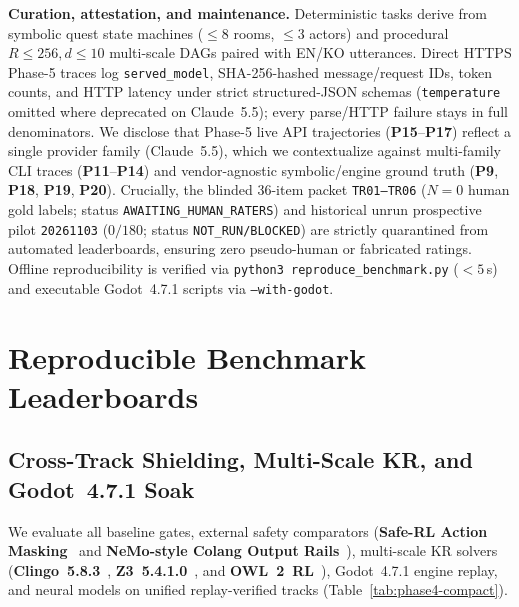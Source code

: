\textbf{Curation, attestation, and maintenance.} Deterministic tasks derive from symbolic quest state machines (${\le}8$ rooms, ${\le}3$ actors) and procedural $R{\le}256, d{\le}10$ multi-scale DAGs paired with EN/KO utterances. Direct HTTPS Phase-5 traces log \texttt{served\_model}, SHA-256-hashed message/request IDs, token counts, and HTTP latency under strict structured-JSON schemas (\texttt{temperature} omitted where deprecated on Claude~5.5); every parse/HTTP failure stays in full denominators. We disclose that Phase-5 live API trajectories (\textbf{P15}--\textbf{P17}) reflect a single provider family (Claude~5.5), which we contextualize against multi-family CLI traces (\textbf{P11}--\textbf{P14}) and vendor-agnostic symbolic/engine ground truth (\textbf{P9}, \textbf{P18}, \textbf{P19}, \textbf{P20}). Crucially, the blinded 36-item packet \texttt{TR01--TR06} ($N{=}0$ human gold labels; status \texttt{AWAITING\_HUMAN\_RATERS}) and historical unrun prospective pilot \texttt{20261103} ($0/180$; status \texttt{NOT\_RUN/BLOCKED}) are strictly quarantined from automated leaderboards, ensuring zero pseudo-human or fabricated ratings. Offline reproducibility is verified via \texttt{python3 reproduce\_benchmark.py} ($<5$\,s) and executable Godot~4.7.1 scripts via \texttt{--with-godot}.

\section{Reproducible Benchmark Leaderboards}\label{sec:eval}
\subsection{Cross-Track Shielding, Multi-Scale KR, and Godot~4.7.1 Soak}\label{sec:phase4-compact}
We evaluate all baseline gates, external safety comparators (\textbf{Safe-RL Action Masking}~\cite{alshiekh2018shield} and \textbf{NeMo-style Colang Output Rails}~\cite{rebedea2023nemo}), multi-scale KR solvers (\textbf{Clingo~5.8.3}~\cite{gebser2019clingo}, \textbf{Z3~5.4.1.0}~\cite{demoura2008z3}, and \textbf{OWL~2~RL}~\cite{motik2012owl2profiles}), Godot~4.7.1 engine replay, and neural models on unified replay-verified tracks (Table~\ref{tab:phase4-compact}).

